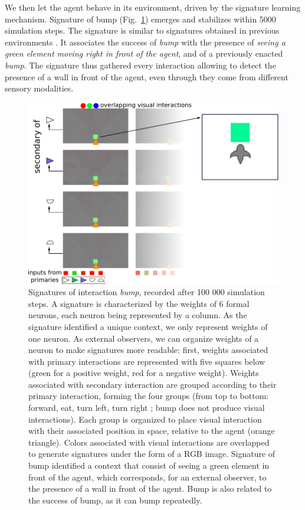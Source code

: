 \documentclass[conference]{IEEEtran}
\makeatletter
\let\cite\relax
\DeclareRobustCommand{\cite}{%
	\let\new@cite@pre\@gobble
	\@ifnextchar[\new@cite{\@citex[]}}
\def\new@cite[#1]{\@ifnextchar[{\new@citea{#1}}{\@citex[#1]}}
\def\new@citea#1{\def\new@cite@pre{#1}\@citex}
\makeatother
\begin{document}
We then let the agent behave in its environment, driven by the signature learning mechanism. 
Signature of bump (Fig.~\ref{fig:bump}) emerges and stabilizes within 5000 simulation steps. 
The signature is similar to signatures obtained in previous environments \cite{gay:space}\cite{gay:dynamic}.
It associates the success of \textit{bump} with the presence of \textit{seeing a green element moving right in front of the agent}, and of a previously enacted \textit{bump}. 
The signature thus gathered every interaction allowing to detect the presence of a wall in front of the agent, even through they come from different sensory modalities.

\begin{figure}[ht]
\centerline{\includegraphics[scale=0.35]{img/Signatures1_5.pdf}}
\caption{Signatures of interaction \textit{bump}, recorded after 100 000 simulation steps. A signature is characterized by the weights of 6 formal neurons, each neuron being represented by a column. 
As the signature identified a unique context, we only represent weights of one neuron. 
As external observers, we can organize weights of a neuron to make signatures more readable: first, weights associated with primary interactions are represented with five squares below (green for a positive weight, red for a negative weight). 
Weights associated with secondary interaction are grouped according to their primary interaction, forming the four groups (from top to bottom: forward, eat, turn left, turn right ; bump does not produce visual interactions). 
Each group is organized to place visual interaction with their associated position in space, relative to the agent (orange triangle). 
Colors associated with visual interactions are overlapped to generate signatures under the form of a RGB image. 
Signature of bump identified a context that consist of seeing a green element in front of the agent, which corresponds, for an external observer, to the presence of a wall in front of the agent. 
Bump is also related to the success of bump, as it can bump repeatedly.
}
\label{fig:bump}
\end{figure}
\end{document}

